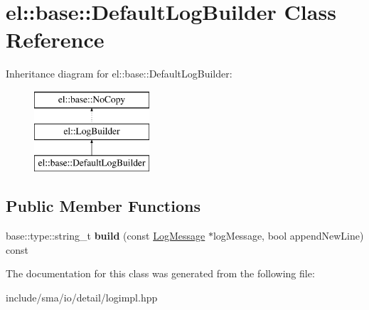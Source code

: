 \hypertarget{classel_1_1base_1_1DefaultLogBuilder}{\section{el\-:\-:base\-:\-:Default\-Log\-Builder Class Reference}
\label{classel_1_1base_1_1DefaultLogBuilder}
}
Inheritance diagram for el\-:\-:base\-:\-:Default\-Log\-Builder\-:\begin{figure}[H]
\begin{center}
\leavevmode
\includegraphics[height=3.000000cm]{classel_1_1base_1_1DefaultLogBuilder}
\end{center}
\end{figure}
\subsection*{Public Member Functions}
\begin{DoxyCompactItemize}
\item 
\hypertarget{classel_1_1base_1_1DefaultLogBuilder_aa8d2f42068115d899ed81de1b0ed360e}{base\-::type\-::string\-\_\-t {\bfseries build} (const \hyperlink{classel_1_1LogMessage}{Log\-Message} $\ast$log\-Message, bool append\-New\-Line) const }\label{classel_1_1base_1_1DefaultLogBuilder_aa8d2f42068115d899ed81de1b0ed360e}

\end{DoxyCompactItemize}


The documentation for this class was generated from the following file\-:\begin{DoxyCompactItemize}
\item 
include/sma/io/detail/logimpl.\-hpp\end{DoxyCompactItemize}
